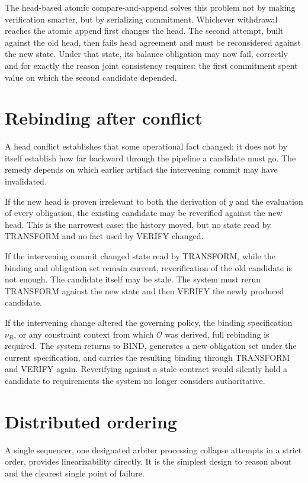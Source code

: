 \documentclass[11pt,openany]{book}
\begin{document}
The head-based atomic compare-and-append solves this problem not by making
verification smarter, but by serializing commitment. Whichever withdrawal
reaches the atomic append first changes the head. The second attempt, built
against the old head, then fails head agreement and must be reconsidered
against the new state. Under that state, its balance obligation may now fail,
correctly and for exactly the reason joint consistency requires: the first
commitment spent value on which the second candidate depended.

\section{Rebinding after conflict}
A head conflict establishes that some operational fact changed; it does not by
itself establish how far backward through the pipeline a candidate must go.
The remedy depends on which earlier artifact the intervening commit may have
invalidated.

If the new head is proven irrelevant to both the derivation of \(y\) and the
evaluation of every obligation, the existing candidate may be reverified
against the new head. This is the narrowest case: the history moved, but no
state read by TRANSFORM and no fact used by VERIFY changed.

If the intervening commit changed state read by TRANSFORM, while the binding
and obligation set remain current, reverification of the old candidate is not
enough. The candidate itself may be stale. The system must rerun TRANSFORM
against the new state and then VERIFY the newly produced candidate.

If the intervening change altered the governing policy, the binding
specification \(\nu_B\), or any constraint context from which \(\mathcal O\) was
derived, full rebinding is required. The system returns to BIND, generates a
new obligation set under the current specification, and carries the resulting
binding through TRANSFORM and VERIFY again. Reverifying against a stale
contract would silently hold a candidate to requirements the system no longer
considers authoritative.

\section{Distributed ordering}
A single sequencer, one designated arbiter processing collapse attempts in a
strict order, provides linearizability directly. It is the simplest design to
reason about and the clearest single point of failure.
\end{document}
